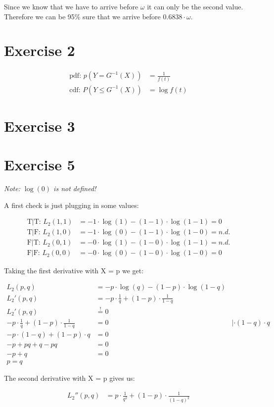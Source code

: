 Since we know that we have to arrive before $\omega$ it can only be the second value. Therefore we can be 95\% sure that we arrive before $0.6838 \cdot \omega$.


\section*{Exercise 2}
\begin{align*}
\mbox{pdf: } p\left(Y   =  G^{-1}\left(X\right)\right) &= \frac{1}{f\left(t\right)} \\
\mbox{cdf: } P\left(Y \leq G^{-1}\left(X\right)\right) &= \log{f\left(t\right)}
\end{align*}


\section*{Exercise 3}



\section*{Exercise 5}
\textit{Note: $\log{\left(0\right)}$ is not defined!}

A first check is just plugging in some values:

\begin{align*}
\mbox{T|T: }L_2(1,1) &= -1 \cdot \log{\left( 1 \right)} - (1 - 1) \cdot \log{\left(1 - 1\right)} = 0    \\
\mbox{T|F: }L_2(1,0) &= -1 \cdot \log{\left( 0 \right)} - (1 - 1) \cdot \log{\left(1 - 0\right)} = n.d. \\
\mbox{F|T: }L_2(0,1) &= -0 \cdot \log{\left( 1 \right)} - (1 - 0) \cdot \log{\left(1 - 1\right)} = n.d. \\
\mbox{F|F: }L_2(0,0) &= -0 \cdot \log{\left( 0 \right)} - (1 - 0) \cdot \log{\left(1 - 0\right)} = 0
\end{align*}


Taking the first derivative with X = p we get:

\begin{align*}
  L_2 (p,q) &= -p \cdot \log{\left(q \right)} - (1-p) \cdot \log{\left(1-q \right)} \\
  L_2' (p,q) &= -p \cdot \frac{1}{q} + (1-p) \cdot \frac{1}{1-q} \\
  L_2' (p,q) &\stackrel{!}{=} 0 \\
   -p \cdot \frac{1}{q} + (1-p) \cdot \frac{1}{1-q} &= 0 &| \cdot (1-q) \cdot q \\
  -p \cdot (1-q) + (1-p) \cdot q & = 0 \\
  -p + pq + q - pq &= 0\\
  -p + q &= 0 \\
  p = q
\end{align*}

 The second derivative with X = p gives us:
 
 \begin{align*}
   L_2'' (p,q) &= p \cdot \frac{1}{q^2} + (1-p) \cdot \frac{1}{(1-q)^2}\\
\end{align*}

